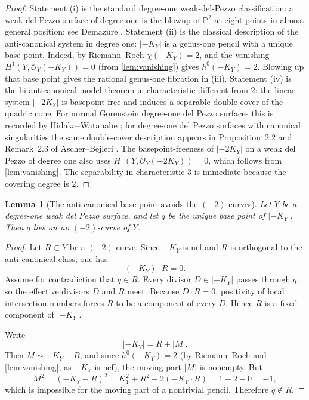 \documentclass[11pt]{article}
\newtheorem{lemma}[lemma]{Lemma}
\theoremstyle{definition}
\newcommand{\Pbb}{\mathbb P}
\begin{document}
\begin{proof}
Statement (i) is the standard degree-one weak-del-Pezzo classification: a weak del Pezzo surface of degree one is the blowup of $\Pbb^2$ at eight points in almost general position; see Demazure \cite{Demazure80}. Statement (ii) is the classical description of the anti-canonical system in degree one: $|-K_Y|$ is a genus-one pencil with a unique base point. Indeed, by Riemann--Roch $\chi(-K_Y)=2$, and the vanishing $H^1(Y,\mathcal O_Y(-K_Y))=0$ (from \cref{lem:vanishing}) gives $h^0(-K_Y)=2$. Blowing up that base point gives the rational genus-one fibration in (iii). Statement (iv) is the bi-anticanonical model theorem in characteristic different from $2$: the linear system $|-2K_Y|$ is basepoint-free and induces a separable double cover of the quadric cone. For normal Gorenstein degree-one del Pezzo surfaces this is recorded by Hidaka--Watanabe \cite{HW81}; for degree-one del Pezzo surfaces with canonical singularities the same double-cover description appears in Proposition~2.2 and Remark~2.3 of Ascher--Bejleri \cite{AscherBejleri21}. The basepoint-freeness of $|-2K_Y|$ on a weak del Pezzo of degree one also uses $H^1(Y,\mathcal O_Y(-2K_Y))=0$, which follows from \cref{lem:vanishing}. The separability in characteristic $3$ is immediate because the covering degree is $2$.
\end{proof}

\begin{lemma}[The anti-canonical base point avoids the $(-2)$-curves]\label{lem:basepoint-avoids-minus2}
Let $Y$ be a degree-one weak del Pezzo surface, and let $q$ be the unique base point of $|-K_Y|$. Then $q$ lies on no $(-2)$-curve of $Y$.
\end{lemma}

\begin{proof}
Let $R\subset Y$ be a $(-2)$-curve. Since $-K_Y$ is nef and $R$ is orthogonal to the anti-canonical class, one has
\[
(-K_Y)\cdot R=0.
\]
Assume for contradiction that $q\in R$. Every divisor $D\in |-K_Y|$ passes through $q$, so the effective divisors $D$ and $R$ meet. Because $D\cdot R=0$, positivity of local intersection numbers forces $R$ to be a component of every $D$. Hence $R$ is a fixed component of $|-K_Y|$.

Write
\[
|-K_Y| = R + |M|.
\]
Then $M\sim -K_Y-R$, and since $h^0(-K_Y)=2$ (by Riemann--Roch and \cref{lem:vanishing}, as $-K_Y$ is nef), the moving part $|M|$ is nonempty. But
\[
M^2 = (-K_Y-R)^2 = K_Y^2 + R^2 - 2(-K_Y\cdot R)=1-2-0=-1,
\]
which is impossible for the moving part of a nontrivial pencil. Therefore $q\notin R$.
\end{proof}
\end{document}
